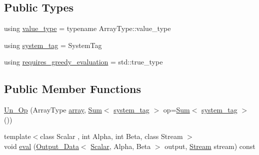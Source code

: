 \subsection*{Public Types}
\begin{DoxyCompactItemize}
\item 
using \hyperlink{structbc_1_1tensors_1_1exprs_1_1Un__Op_3_01Sum_3_01SystemTag_01_4_00_01ArrayType_01_4_a9af0930ab658164b756c531bc2d16a3e}{value\+\_\+type} = typename Array\+Type\+::value\+\_\+type
\item 
using \hyperlink{structbc_1_1tensors_1_1exprs_1_1Un__Op_3_01Sum_3_01SystemTag_01_4_00_01ArrayType_01_4_adcf344b839121a6264ce6c514c95f145}{system\+\_\+tag} = System\+Tag
\item 
using \hyperlink{structbc_1_1tensors_1_1exprs_1_1Un__Op_3_01Sum_3_01SystemTag_01_4_00_01ArrayType_01_4_a5c5f8513db68f6440f2fc53434f1d312}{requires\+\_\+greedy\+\_\+evaluation} = std\+::true\+\_\+type
\end{DoxyCompactItemize}
\subsection*{Public Member Functions}
\begin{DoxyCompactItemize}
\item 
\hyperlink{structbc_1_1tensors_1_1exprs_1_1Un__Op_3_01Sum_3_01SystemTag_01_4_00_01ArrayType_01_4_af86e9a2543d2e1e5e94ae031a1c78107}{Un\+\_\+\+Op} (Array\+Type \hyperlink{structbc_1_1tensors_1_1exprs_1_1Un__Op_3_01Sum_3_01SystemTag_01_4_00_01ArrayType_01_4_a42e9a2a514ab1934297d8d2e3b34bca5}{array}, \hyperlink{structbc_1_1tensors_1_1exprs_1_1Sum}{Sum}$<$ \hyperlink{structbc_1_1tensors_1_1exprs_1_1Un__Op_3_01Sum_3_01SystemTag_01_4_00_01ArrayType_01_4_adcf344b839121a6264ce6c514c95f145}{system\+\_\+tag} $>$ op=\hyperlink{structbc_1_1tensors_1_1exprs_1_1Sum}{Sum}$<$ \hyperlink{structbc_1_1tensors_1_1exprs_1_1Un__Op_3_01Sum_3_01SystemTag_01_4_00_01ArrayType_01_4_adcf344b839121a6264ce6c514c95f145}{system\+\_\+tag} $>$())
\item 
{\footnotesize template$<$class Scalar , int Alpha, int Beta, class Stream $>$ }\\void \hyperlink{structbc_1_1tensors_1_1exprs_1_1Un__Op_3_01Sum_3_01SystemTag_01_4_00_01ArrayType_01_4_a8144ef1cc85baef5731e39fdaf677bbf}{eval} (\hyperlink{structbc_1_1tensors_1_1exprs_1_1Output__Data}{Output\+\_\+\+Data}$<$ \hyperlink{namespacebc_aa12ac55ee2c43dc082894dd3859daee1}{Scalar}, Alpha, Beta $>$ output, \hyperlink{classbc_1_1streams_1_1Stream}{Stream} stream) const
\end{DoxyCompactItemize}
